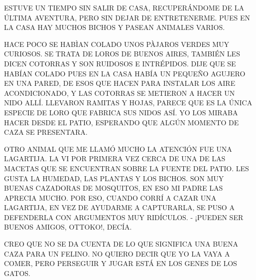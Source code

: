 \newpage
{}	
ESTUVE UN TIEMPO SIN SALIR DE CASA, RECUPERÁNDOME DE LA ÚLTIMA AVENTURA, PERO SIN DEJAR DE ENTRETENERME. PUES EN LA CASA HAY MUCHOS BICHOS Y PASEAN ANIMALES VARIOS. 

HACE POCO SE HABÌAN COLADO UNOS PÀJAROS VERDES MUY CURIOSOS. SE TRATA DE LOROS DE BUENOS AIRES, TAMBIÉN LES DICEN COTORRAS Y SON RUIDOSOS E INTRÉPIDOS. DIJE QUE SE HABÍAN COLADO PUES EN LA CASA HABÍA UN PEQUEÑO AGUJERO EN UNA PARED, DE ESOS QUE HACEN PARA INSTALAR LOS AIRE ACONDICIONADO, Y LAS COTORRAS SE METIERON A HACER UN NIDO ALLÍ. LLEVARON RAMITAS Y HOJAS, PARECE QUE ES LA ÚNICA ESPECIE DE LORO QUE FABRICA SUS NIDOS ASÍ. YO LOS MIRABA HACER DESDE EL PATIO, ESPERANDO QUE ALGÚN MOMENTO DE CAZA SE PRESENTARA. 

\newpage
{}

OTRO ANIMAL QUE ME LLAMÓ MUCHO LA ATENCIÓN FUE UNA LAGARTIJA. LA VI POR PRIMERA VEZ CERCA DE UNA DE LAS MACETAS QUE SE ENCUENTRAN SOBRE LA FUENTE DEL PATIO. LES GUSTA LA HUMEDAD, LAS PLANTAS Y LOS BICHOS. SON MUY BUENAS CAZADORAS DE MOSQUITOS, EN ESO MI PADRE LAS APRECIA MUCHO. POR ESO, CUANDO CORRÍ A CAZAR UNA LAGARTIJA, EN VEZ DE AYUDARME A CAPTURARLA, SE PUSO A DEFENDERLA CON ARGUMENTOS MUY RIDÍCULOS.
- ¡PUEDEN SER BUENOS AMIGOS, OTTOKO!, DECÍA.

CREO QUE NO SE DA CUENTA DE LO QUE SIGNIFICA UNA BUENA CAZA PARA UN FELINO. NO QUIERO DECIR  QUE YO LA VAYA A COMER, PERO PERSEGUIR Y JUGAR ESTÁ EN LOS GENES DE LOS GATOS.




\newpage
{}


